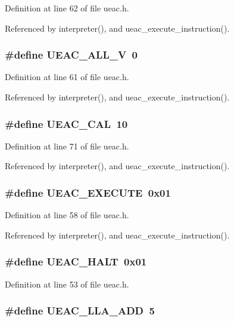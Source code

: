 Definition at line 62 of file ueac.h.

Referenced by interpreter(), and ueac\_\-execute\_\-instruction().
\subsubsection{\setlength{\rightskip}{0pt plus 5cm}\#define UEAC\_\-ALL\_\-V~0}\label{ueac_8h_a8}




Definition at line 61 of file ueac.h.

Referenced by interpreter(), and ueac\_\-execute\_\-instruction().
\subsubsection{\setlength{\rightskip}{0pt plus 5cm}\#define UEAC\_\-CAL~10}\label{ueac_8h_a18}




Definition at line 71 of file ueac.h.

Referenced by interpreter(), and ueac\_\-execute\_\-instruction().
\subsubsection{\setlength{\rightskip}{0pt plus 5cm}\#define UEAC\_\-EXECUTE~0x01}\label{ueac_8h_a7}




Definition at line 58 of file ueac.h.

Referenced by interpreter(), and ueac\_\-execute\_\-instruction().
\subsubsection{\setlength{\rightskip}{0pt plus 5cm}\#define UEAC\_\-HALT~0x01}\label{ueac_8h_a4}




Definition at line 53 of file ueac.h.
\subsubsection{\setlength{\rightskip}{0pt plus 5cm}\#define UEAC\_\-LLA\_\-ADD~5}\label{ueac_8h_a13}





